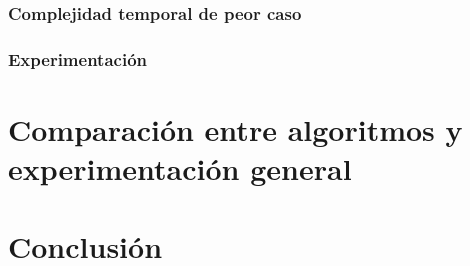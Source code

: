 \documentclass[a4paper, 10pt, twoside]{article}
\begin{document}
      \subsubsection{Complejidad temporal de peor caso}
      \label{subsub:algoritmos-heuristicos-grasp-complejidad.tex}
      

      \subsubsection{Experimentación}
      \label{subsub:algoritmos-heuristicos-grasp-experimentacion.tex}
      

\newpage



\section{Comparación entre algoritmos y experimentación general}
\label{sec:experimentacion-general}



\newpage

\section{Conclusión}
\label{sec:conclusion}



\newpage
\end{document}
